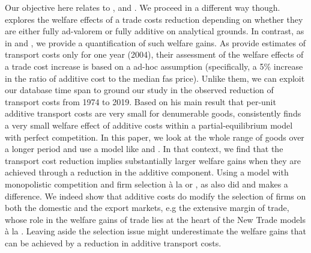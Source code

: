 \documentclass[a4paper,11pt]{article}
\newcommand\cites[1]{\citeauthor{#1}'s\ (\citeyear{#1})}
\begin{document}
Our objective here relates to \cite{Irrazabal_2015}, \cite{sorensen2014} and \cite{Lashkaripour_JIE2020}. We proceed in a different way though. \cite{sorensen2014} explores the welfare effects of a trade costs reduction depending on whether they are either fully ad-valorem or fully additive on analytical grounds. In contrast, as in \cite{Irrazabal_2015} and \cite{Lashkaripour_JIE2020}, we provide a quantification of such welfare gains. As \cite{Irrazabal_2015} provide estimates of transport costs only for one year (2004), their assessment of the welfare effects of a trade cost increase is based on a ad-hoc assumption (specifically, a 5\% increase in the ratio of additive cost to the median fas price). Unlike them, we can exploit our database time span to ground our study in the observed reduction of transport costs from 1974 to 2019. Based on his main result that per-unit additive transport costs are very small for denumerable goods, \cite{Lashkaripour_JIE2020} consistently finds a very small welfare effect of additive costs within a partial-equilibrium model with perfect competition. In this paper, we look at the whole range of goods over a longer period and use a \citet{melitz} model like \cite{sorensen2014} and \cite{Irrazabal_2015}. In that context,
we find that the transport cost reduction implies substantially larger welfare gains when they are achieved through a reduction in the additive component.
Using a model with monopolistic competition and firm selection \`{a} la \cite{melitz} or \cite{chaney2008}, as also did \cite{sorensen2014} and \cite{Irrazabal_2015} makes a difference. We indeed show that additive costs do modify the selection of firms on both the domestic and the export markets, e.g the extensive margin of trade, whose role in the welfare gains of trade lies at the heart of the New Trade models  \`{a} la \cite{melitz}. Leaving aside the selection issue might underestimate the welfare gains that can be achieved by a reduction in additive transport costs.
\end{document}
